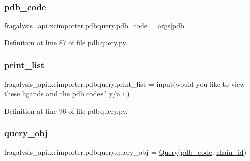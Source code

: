 \subsubsection{\texorpdfstring{pdb\+\_\+code}{pdb\_code}}
{\footnotesize\ttfamily fragalysis\+\_\+api.\+xcimporter.\+pdbquery.\+pdb\+\_\+code = \hyperlink{namespacefragalysis__api_1_1xcimporter_1_1pdbquery_aa63ace70140ec79679f3f8be87bb2564}{args}\mbox{[}\textquotesingle{}pdb\textquotesingle{}\mbox{]}}



Definition at line 87 of file pdbquery.\+py.

\mbox{\label{namespacefragalysis__api_1_1xcimporter_1_1pdbquery_a86c375701bbb49fc0670930962e1d2ee}} 
\subsubsection{\texorpdfstring{print\+\_\+list}{print\_list}}
{\footnotesize\ttfamily fragalysis\+\_\+api.\+xcimporter.\+pdbquery.\+print\+\_\+list = input(\textquotesingle{}would you like to view these ligands and the pdb codes? y/n \+: \textquotesingle{})}



Definition at line 96 of file pdbquery.\+py.

\mbox{\label{namespacefragalysis__api_1_1xcimporter_1_1pdbquery_a71559cdf9dc34b17a0a1833931cf988f}} 
\subsubsection{\texorpdfstring{query\+\_\+obj}{query\_obj}}
{\footnotesize\ttfamily fragalysis\+\_\+api.\+xcimporter.\+pdbquery.\+query\+\_\+obj = \hyperlink{classfragalysis__api_1_1xcimporter_1_1pdbquery_1_1_query}{Query}(\hyperlink{namespacefragalysis__api_1_1xcimporter_1_1pdbquery_a05fc5cbce237e976cd5303cd1f1141ad}{pdb\+\_\+code}, \hyperlink{namespacefragalysis__api_1_1xcimporter_1_1pdbquery_a76497bee6f8c2a47827613858ded72d5}{chain\+\_\+id})}



